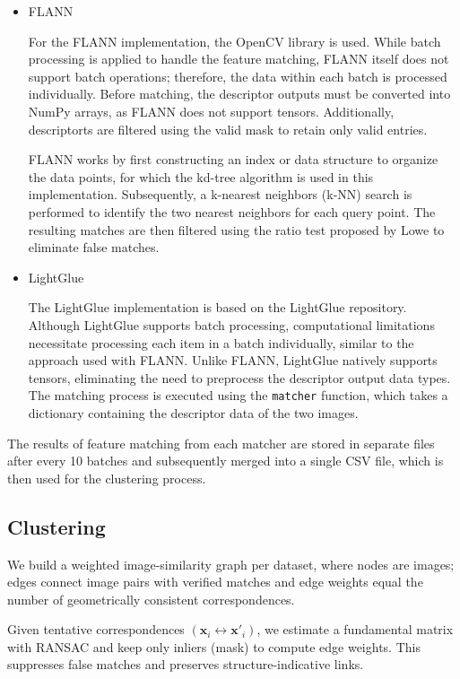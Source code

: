 \documentclass[report.tex]{subfiles}
\begin{document}
    \begin{itemize}
        \item FLANN

        For the FLANN implementation, the OpenCV library is used. While batch processing is applied to handle the feature matching, FLANN itself does not support batch operations; therefore, the data within each batch is processed individually. Before matching, the descriptor outputs must be converted into NumPy arrays, as FLANN does not support tensors. Additionally, descriptorts are filtered using the valid mask to retain only valid entries.

        FLANN works by first constructing an index or data structure to organize the data points, for which the kd-tree algorithm is used in this implementation. Subsequently, a k-nearest neighbors (k-NN) search is performed to identify the two nearest neighbors for each query point. The resulting matches are then filtered using the ratio test proposed by Lowe \cite{lowe2004sift} to eliminate false matches.
        
        \item LightGlue

        The LightGlue implementation is based on the LightGlue repository. Although LightGlue supports batch processing, computational limitations necessitate processing each item in a batch individually, similar to the approach used with FLANN. Unlike FLANN, LightGlue natively supports tensors, eliminating the need to preprocess the descriptor output data types. The matching process is executed using the \texttt{matcher} function, which takes a dictionary containing the descriptor data of the two images.
    \end{itemize}

    The results of feature matching from each matcher are stored in separate files after every 10 batches and subsequently merged into a single CSV file, which is then used for the clustering process.
    \subsection{Clustering}
We build a weighted image-similarity graph per dataset, where nodes are images; edges connect image pairs with verified matches and edge weights equal the number of geometrically consistent correspondences.

Given tentative correspondences \((\mathbf{x}_i \leftrightarrow \mathbf{x}'_i)\), we estimate a fundamental matrix with RANSAC and keep only inliers (mask) to compute edge weights.
This suppresses false matches and preserves structure-indicative links.
\end{document}
